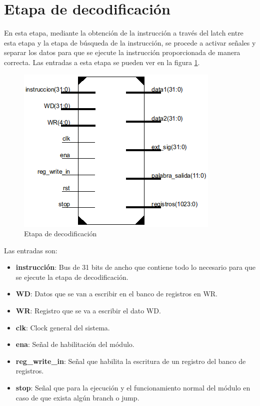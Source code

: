 \section{Etapa de decodificaci\'on}

En esta etapa, mediante la obtenci\'on de la instrucci\'on a trav\'es del latch entre esta etapa y la etapa de b\'usqueda de la instrucci\'on, se procede a activar señales y separar los datos para que se ejecute la instrucci\'on proporcionada de manera correcta.
Las entradas a esta etapa se pueden ver en la figura \ref{fig:decode}.

\begin{figure}[H]
\centering
\includegraphics[scale=0.5]{img/decode_stage}
\caption{Etapa de decodificaci\'on}
\label{fig:decode}
\end{figure}

 
Las entradas son: 
\begin{itemize}
  \item \textbf{instrucci\'on}: Bus de 31 bits de ancho que contiene todo lo necesario para que se ejecute la etapa de decodificaci\'on.
  \item \textbf{WD}: Datos que se van a escribir en el banco de registros en WR.
  \item \textbf{WR}: Registro que se va a escribir el dato WD.
  \item \textbf{clk}: Clock general del sistema.
  \item \textbf{ena}: Señal de habilitaci\'on del m\'odulo.
  \item \textbf{reg\_write\_in}: Señal que habilita la escritura de un registro del banco de registros.
  \item \textbf{stop}: Señal que para la ejecuci\'on y el funcionamiento normal del m\'odulo en caso de que exista alg\'un branch o jump. 
\end{itemize}

